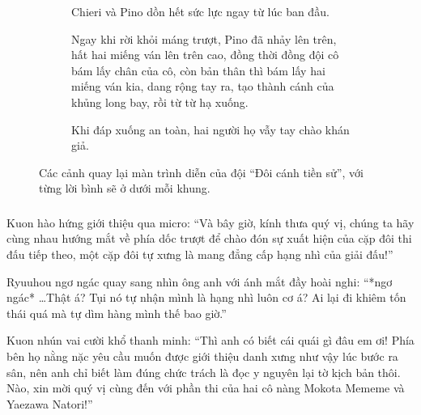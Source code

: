 \documentclass[../main.tex]{subfiles}
\begin{document}
\begin{figure}[H]
  \centering
  \begin{subfigure}[t]{0.45\textwidth}
    \centering
    \caption{Chieri và Pino dồn hết sức lực ngay từ lúc ban đầu.}
  \end{subfigure}
  \quad
  \begin{subfigure}[t]{0.45\textwidth}
    \centering
    \caption{Ngay khi rời khỏi máng trượt, Pino đã nhảy lên trên, hất hai miếng ván lên trên cao, đồng thời đồng đội cô bám lấy chân của cô, còn bản thân thì bám lấy hai miếng ván kia, dang rộng tay ra, tạo thành cánh của khủng long bay, rồi từ từ hạ xuống.}
  \end{subfigure}
  \quad
  \begin{subfigure}[t]{0.45\textwidth}
    \centering
    \caption{Khi đáp xuống an toàn, hai người họ vẫy tay chào khán giả.}
  \end{subfigure}
  \caption{Các cảnh quay lại màn trình diễn của đội ``Đôi cánh tiền sử'', với từng lời bình sẽ ở dưới mỗi khung.}
\end{figure}

\subsubsection*{\label{ep-003.I}}

Kuon hào hứng giới thiệu qua micro: ``Và bây giờ, kính thưa quý vị, chúng ta hãy cùng nhau hướng mắt về phía dốc trượt để chào đón sự xuất hiện của cặp đôi thi đấu tiếp theo, một cặp đôi tự xưng là mang đẳng cấp hạng nhì của giải đấu!''

Ryuuhou ngơ ngác quay sang nhìn ông anh với ánh mắt đầy hoài nghi: ``*ngơ ngác* \dots Thật á? Tụi nó tự nhận mình là hạng nhì luôn cơ á? Ai lại đi khiêm tốn thái quá mà tự dìm hàng mình thế bao giờ.''

Kuon nhún vai cười khổ thanh minh: ``Thì anh có biết cái quái gì đâu em ơi! Phía bên họ nằng nặc yêu cầu muốn được giới thiệu danh xưng như vậy lúc bước ra sân, nên anh chỉ biết làm đúng chức trách là đọc y nguyên lại tờ kịch bản thôi. Nào, xin mời quý vị cùng đến với phần thi của hai cô nàng Mokota Mememe và Yaezawa Natori!''
\end{document}
